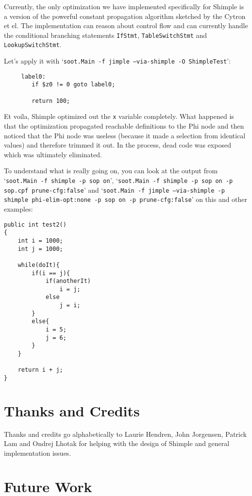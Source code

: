 \documentclass[10pt,letterpaper,oneside,onecolumn]{article}
\begin{document}
Currently, the only optimization we have implemented specifically for
Shimple is a version of the powerful constant propagation algorithm
sketched by the Cytron et el.  The implementation can reason about
control flow and can currently handle the conditional branching
statements {\tt IfStmt}, {\tt TableSwitchStmt} and {\tt
LookupSwitchStmt}.

Let's apply it with `{\tt soot.Main -f jimple --via-shimple -O
ShimpleTest}':

\begin{verbatim}
     label0:
        if $z0 != 0 goto label0;

        return 100;
\end{verbatim}

Et voila, Shimple optimized out the {\tt x} variable completely. What
happened is that the optimization propagated reachable definitions to
the Phi node and then noticed that the Phi node was useless (because
it made a selection from identical values) and therefore trimmed it
out.  In the process, dead code was exposed which was ultimately
eliminated.

To understand what is really going on, you can look at the output from
`{\tt soot.Main -f shimple -p sop on}', `{\tt soot.Main -f shimple -p sop
on -p sop.cpf prune-cfg:false}' and `{\tt soot.Main -f jimple
--via-shimple -p shimple phi-elim-opt:none -p sop on -p
prune-cfg:false}' on this and other examples:

\begin{verbatim}
public int test2()
{
    int i = 1000;
    int j = 1000;

    while(doIt){
        if(i == j){
            if(anotherIt)
                i = j;
            else
                j = i;
        }
        else{
            i = 5;
            j = 6;
        }
    }

    return i + j;
}
\end{verbatim}

\section{Thanks and Credits}

Thanks and credits go alphabetically to Laurie Hendren, John
Jorgensen, Patrick Lam and Ondrej Lhotak for helping with the design
of Shimple and general implementation issues.

\section{Future Work}
\end{document}

